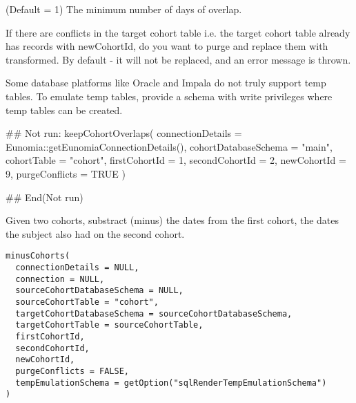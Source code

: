 \documentclass[a4paper]{book}
\begin{document}
\begin{Arguments}
\begin{ldescription}
\item[\code{minimumOverlapDays}] (Default = 1) The minimum number of days of overlap.

\item[\code{purgeConflicts}] If there are conflicts in the target cohort table i.e. the target cohort table
already has records with newCohortId, do you want to purge and replace them
with transformed. By default - it will not be replaced, and an error message is thrown.

\item[\code{tempEmulationSchema}] Some database platforms like Oracle and Impala do not truly support
temp tables. To emulate temp tables, provide a schema with write
privileges where temp tables can be created.
\end{ldescription}
\end{Arguments}
%
\begin{Examples}
\begin{ExampleCode}
## Not run: 
keepCohortOverlaps(
  connectionDetails = Eunomia::getEunomiaConnectionDetails(),
  cohortDatabaseSchema = "main",
  cohortTable = "cohort",
  firstCohortId = 1,
  secondCohortId = 2,
  newCohortId = 9,
  purgeConflicts = TRUE
)

## End(Not run)

\end{ExampleCode}
\end{Examples}
%
\begin{Description}\relax
Given two cohorts, substract (minus) the dates from the first cohort, the
dates the subject also had on the second cohort.

\strong{[Stable]}
\end{Description}
%
\begin{Usage}
\begin{verbatim}
minusCohorts(
  connectionDetails = NULL,
  connection = NULL,
  sourceCohortDatabaseSchema = NULL,
  sourceCohortTable = "cohort",
  targetCohortDatabaseSchema = sourceCohortDatabaseSchema,
  targetCohortTable = sourceCohortTable,
  firstCohortId,
  secondCohortId,
  newCohortId,
  purgeConflicts = FALSE,
  tempEmulationSchema = getOption("sqlRenderTempEmulationSchema")
)
\end{verbatim}
\end{Usage}
%
\end{document}
